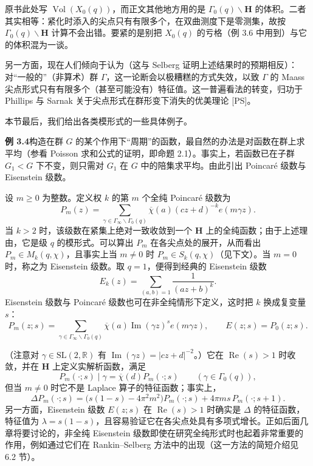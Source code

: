 \begin{annote}
原书此处写 $\operatorname{Vol}(X_{0}(q))$，而正文其他地方用的是 $\Gamma_{0}(q)\backslash\mathbf{H}$ 的体积。二者其实相等：紧化时添入的尖点只有有限多个，在双曲测度下是零测集，故按 $\Gamma_{0}(q)\backslash\mathbf{H}$ 计算不会出错。要紧的是别把 $X_{0}(q)$ 的亏格（例 3.6 中用到）与它的体积混为一谈。
\par\vspace{0.15em}{\raggedleft 【来源：原书 §3（A）；Iwaniec《Introduction to the Spectral Theory of Automorphic Forms》第 10--11 章（A）】\par}
\end{annote}

另一方面，现在人们倾向于认为（这与 Selberg 证明上述结果时的预期相反）：对“一般的”（非算术）群 $\Gamma$，这一论断会以极糟糕的方式失效，以致 $\Gamma$ 的 Maass 尖点形式只有有限多个（甚至可能没有）特征值。这一普遍看法的转变，归功于 Phillips 与 Sarnak 关于尖点形式在群形变下消失的优美理论 [PS]。

本节最后，我们给出各类模形式的一些具体例子。

\par\medskip\noindent\textbf{例 3.4}\quad 构造在群 $G$ 的某个作用下“周期”的函数，最自然的办法是对函数在群上求平均（参看 Poisson 求和公式的证明，即命题 2.1）。事实上，若函数已在子群 $G_{1}<G$ 下不变，则只需对 $G_{1}$ 在 $G$ 中的陪集求平均。由此引出 Poincaré 级数与 Eisenstein 级数。

设 $m\ge0$ 为整数。定义权 $k$ 的第 $m$ 个全纯 Poincaré 级数为
\[
P_{m}(z)=\sum_{\gamma\in\Gamma_{\infty}\backslash\Gamma_{0}(q)}\overline{\chi}(a)(cz+d)^{-k}e(m\gamma z).
\]
当 $k>2$ 时，该级数在紧集上绝对一致收敛到一个 $\mathbf{H}$ 上的全纯函数；由于上述理由，它是级 $q$ 的模形式。可以算出 $P_{m}$ 在各尖点处的展开，从而看出 $P_{m}\in M_{k}(q,\chi)$，且事实上当 $m\ne0$ 时 $P_{m}\in S_{k}(q,\chi)$（见下文）。当 $m=0$ 时，称之为 Eisenstein 级数。取 $q=1$，便得到经典的 Eisenstein 级数
\[
E_{k}(z)=\sum_{(a,b)=1}\frac{1}{(az+b)^{k}}.
\]
Eisenstein 级数与 Poincaré 级数也可在非全纯情形下定义，这时把 $k$ 换成复变量 $s$：
\begin{equation}\tag{3.3}\label{c3:eq:3.3}
P_{m}(z;s)=\sum_{\gamma\in\Gamma_{\infty}\backslash\Gamma_{0}(q)}\overline{\chi}(a)\operatorname{Im}(\gamma z)^{s}e(m\gamma z),\qquad E(z;s)=P_{0}(z;s).
\end{equation}

（注意对 $\gamma\in\mathrm{SL}(2,\mathbb{R})$ 有 $\operatorname{Im}(\gamma z)=|cz+d|^{-2}$。）它在 $\operatorname{Re}(s)>1$ 时收敛，并在 $\mathbf{H}$ 上定义实解析函数，满足
\[
P_{m}(\cdot;s)\mid\gamma=\overline{\chi}(d)P_{m}(\cdot;s)\qquad(\gamma\in\Gamma_{0}(q)),
\]
但当 $m\ne0$ 时它不是 Laplace 算子的特征函数；事实上，
\[
\Delta P_{m}(\cdot;s)=\bigl(s(1-s)-4\pi^{2}m^{2}\bigr)P_{m}(\cdot;s)+4\pi ms\,P_{m}(\cdot;s+1).
\]
另一方面，Eisenstein 级数 $E(z;s)$ 在 $\operatorname{Re}(s)>1$ 时确实是 $\Delta$ 的特征函数，特征值为 $\lambda=s(1-s)$，且容易验证它在各尖点处具有多项式增长。正如后面几章将要讨论的，非全纯 Eisenstein 级数即使在研究全纯形式时也起着非常重要的作用，例如通过它们在 Rankin--Selberg 方法中的出现（这一方法的简短介绍见 6.2 节）。

